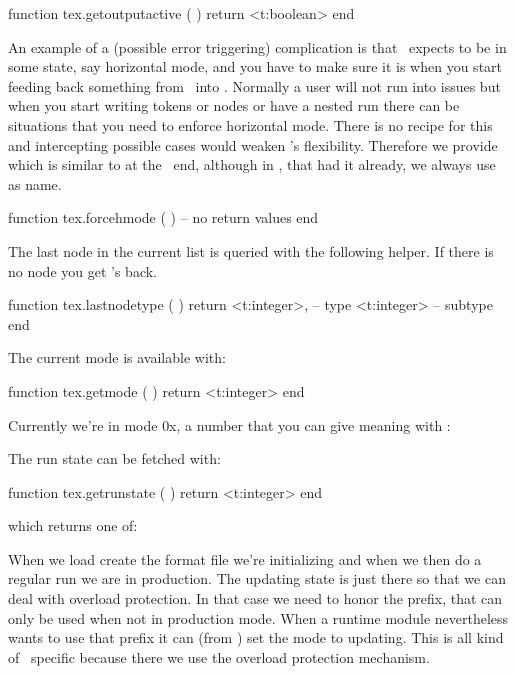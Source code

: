 \starttyping[option=LUA]
function tex.getoutputactive ( )
    return <t:boolean>
end
\stoptyping

An example of a (possible error triggering) complication is that \TEX\ expects to
be in some state, say horizontal mode, and you have to make sure it is when you
start feeding back something from \LUA\ into \TEX. Normally a user will not run
into issues but when you start writing tokens or nodes or have a nested run there
can be situations that you need to enforce horizontal mode. There is no recipe
for this and intercepting possible cases would weaken \LUATEX's flexibility.
Therefore we provide  which is similar to \type {\quitvmode} at
the \TEX\ end, although in \CONTEXT, that had it already, we always use \type
{\dontleavehmode} as name.

\starttyping[option=LUA]
function tex.forcehmode ( )
    -- no return values
end
\stoptyping

The last node in the current list is queried with the following helper. If there is no
node you get 's back.

\starttyping[option=LUA]
function tex.lastnodetype ( )
    return
        <t:integer>, -- type
        <t:integer>  -- subtype
end
\stoptyping

The current mode is available with:

\starttyping[option=LUA]
function tex.getmode ( )
    return <t:integer>
end
\stoptyping

Currently we're in mode {\tttf 0x\tohexadecimal{}}, a
number that you can give meaning with :


The run state can be fetched with:

\starttyping[option=LUA]
function tex.getrunstate ( )
    return <t:integer>
end
\stoptyping

which returns one of:


When we load create the format file we're initializing and when we then do a
regular run we are in production. The updating state is just there so that we can
deal with overload protection. In that case we need to honor the \type
{\enforced} prefix, that can only be used when not in production mode. When a
runtime module nevertheless wants to use that prefix it can (from \LUA) set the
mode to updating. This is all kind of \CONTEXT\ specific because there we use
the overload protection mechanism.

